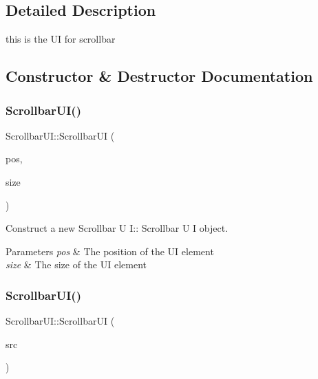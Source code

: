 \subsection{Detailed Description}
this is the UI for scrollbar 

\subsection{Constructor \& Destructor Documentation}
\mbox{\label{class_scrollbar_u_i_ab140070030647953a0624b2a55be54b1}} 
\subsubsection{\texorpdfstring{Scrollbar\+U\+I()}{ScrollbarUI()}\hspace{0.1cm}{\footnotesize\ttfamily [1/2]}}
{\footnotesize\ttfamily Scrollbar\+U\+I\+::\+Scrollbar\+UI (\begin{DoxyParamCaption}\item[{glm\+::vec2}]{pos,  }\item[{glm\+::vec2}]{size }\end{DoxyParamCaption})}



Construct a new Scrollbar U I\+:\+: Scrollbar U I object. 


\begin{DoxyParams}{Parameters}
{\em pos} & The position of the UI element \\
\hline
{\em size} & The size of the UI element \\
\hline
\end{DoxyParams}
\mbox{\label{class_scrollbar_u_i_a5fd6496ba9ec34d5e2e5e86dd18d49fd}} 
\subsubsection{\texorpdfstring{Scrollbar\+U\+I()}{ScrollbarUI()}\hspace{0.1cm}{\footnotesize\ttfamily [2/2]}}
{\footnotesize\ttfamily Scrollbar\+U\+I\+::\+Scrollbar\+UI (\begin{DoxyParamCaption}\item[{\hyperlink{class_scrollbar_u_i}{Scrollbar\+UI} const \&}]{src }\end{DoxyParamCaption})}



